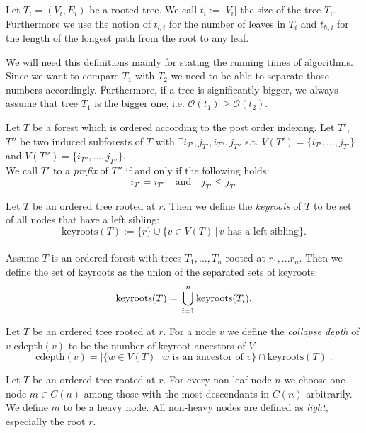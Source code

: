 \begin{defin} Let $T_i=(V_i,E_i)$ be a rooted tree. We call $t_i:= |V_i|$ the size of the tree $T_i$. Furthermore we use the notion of $t_{l,i}$ for the number of leaves in $T_i$ and $t_{h,i}$ for the length of the longest path from the root to any leaf. 
\end{defin}
\begin{rem}
We will need this definitions mainly for stating the running times of algorithms. Since we want to compare $T_1$ with $T_2$ we need to be able to separate those numbers accordingly. Furthermore, if a tree is significantly bigger, we always assume that tree $T_1$ is the bigger one, i.e. $\mathcal{O}(t_1)\geq \mathcal{O}(t_2)$.
\end{rem}
\begin{defin}
Let $T$ be a forest which is ordered according to the post order indexing. Let $T'$, $T''$ be two induced subforests of $T$ with $\exists i_{T'},j_{T'},i_{T''},j_{T''}$ s.t. $V(T')=\{i_{T'},...,j_{T'}\}$ and $V(T'')=\{i_{T''},...,j_{T''}\}$.\\
We call $T'$ to a \textit{prefix} of $T''$ if and only if the following holds:
$$i_{T'} = i_{T''} \quad \text{and} \quad j_{T'} \leq j_{T''}$$
\end{defin}
\begin{defin}
Let $T$ be an ordered tree rooted at $r$. Then we define the \textit{keyroots} of $T$ to be set of all nodes that have a left sibling:
$$\text{keyroots}(T) := \{r\} \cup \{v \in V(T) \,|\,v\text{ has a left sibling}\}.$$\\
Assume $T$ is an ordered forest with trees $T_1,...,T_n$ rooted at $r_1,...r_n$. Then we define the set of keyroots as the union of the separated sets of keyroots:
$$\text{keyroots}(T) = \sideset{}{}\bigcup_{i=1}^n \text{keyroots}(T_i).$$
\end{defin}
\begin{defin}
Let $T$ be an ordered tree rooted at $r$. For a node $v$ we define the \textit{collapse depth} of $v$ cdepth$(v)$ to be the number of keyroot ancestors of $V$:
$$\text{cdepth}(v) = |\{w \in V(T)\,|\, w \text{ is an ancestor of }v\} \cap \text{keyroots}(T)|.$$
\end{defin}
\begin{defin}
Let $T$ be an ordered tree rooted at $r$. For every non-leaf node $n$ we choose one node $m \in C(n)$ among those with the most descendants in $C(n)$ arbitrarily. We define $m$ to be a heavy node. All non-heavy nodes are defined as \textit{light}, especially the root $r$. 
\end{defin}
